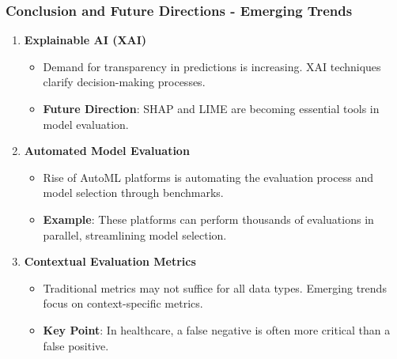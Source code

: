 \documentclass[aspectratio=169]{beamer}
\begin{document}
\begin{frame}[fragile]
    \frametitle{Conclusion and Future Directions - Emerging Trends}
    \begin{enumerate}
        \item \textbf{Explainable AI (XAI)}
        \begin{itemize}
            \item Demand for transparency in predictions is increasing. XAI techniques clarify decision-making processes.
            \item \textbf{Future Direction}: SHAP and LIME are becoming essential tools in model evaluation.
        \end{itemize}
        
        \item \textbf{Automated Model Evaluation}
        \begin{itemize}
            \item Rise of AutoML platforms is automating the evaluation process and model selection through benchmarks.
            \item \textbf{Example}: These platforms can perform thousands of evaluations in parallel, streamlining model selection.
        \end{itemize}
        
        \item \textbf{Contextual Evaluation Metrics}
        \begin{itemize}
            \item Traditional metrics may not suffice for all data types. Emerging trends focus on context-specific metrics.
            \item \textbf{Key Point}: In healthcare, a false negative is often more critical than a false positive.
        \end{itemize}
    \end{enumerate}
\end{frame}
\end{document}
